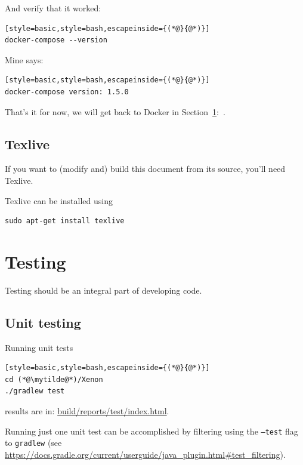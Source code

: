 \documentclass[12pt, a4paper, twoside,openany,titlepage]{article}
\begin{document}
{And verify that it worked:
\begin{lstlisting}[style=basic,style=bash,escapeinside={(*@}{@*)}]
docker-compose --version
\end{lstlisting}
Mine says:
\begin{lstlisting}[style=basic,style=bash,escapeinside={(*@}{@*)}]
docker-compose version: 1.5.0
\end{lstlisting}

That's it for now, we will get back to Docker in Section~\ref{sec:testing}:~.



\subsection{Texlive}

If you want to (modify and) build this document from its \tex source, you'll need Texlive.

Texlive can be installed using
\begin{lstlisting}[style=basic,style=bash]
sudo apt-get install texlive
\end{lstlisting}


\section{Testing}
\label{sec:testing}
Testing should be an integral part of developing code.

\subsection{Unit testing}


Running unit tests
\begin{lstlisting}[style=basic,style=bash,escapeinside={(*@}{@*)}]
cd (*@\mytilde@*)/Xenon
./gradlew test
\end{lstlisting}
results are in: \url{build/reports/test/index.html}.

Running just one unit test can be accomplished by filtering using the \texttt{--test} flag to \texttt{gradlew} (see \url{https://docs.gradle.org/current/userguide/java_plugin.html#test_filtering}).


}
\end{document}
